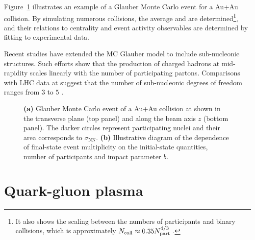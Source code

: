 Figure~\ref{fig:colls:centrality} illustrates an example of a Glauber Monte Carlo event for a Au+Au collision. By simulating numerous collisions, the average \Npart and \Ncoll are determined\footnote{It also shows the scaling between the numbers of participants and binary collisions, which is approximately $N_\mathrm{coll} \approx 0.35 N_\mathrm{part}^{4/3}$ .}, and their relations to centrality and event activity observables are determined by fitting to experimental data.

Recent studies have extended the MC Glauber model to include sub-nucleonic structures. Such efforts show that the production of charged hadrons at mid-rapidity scales linearly with the number of participating partons. Comparisons with LHC data at  suggest that the number of sub-nucleonic degrees of freedom ranges from $3$ to $5$ \cite{loizidesGlauberModelingHighenergy2016}.

\begin{figure}[H]
\hspace{2em}
\caption{\textbf{(a)} Glauber Monte Carlo event of a Au+Au collision at  shown in the transverse plane (top panel) and along the beam axis $z$ (bottom panel). The darker circles represent participating nuclei and their area corresponds to $\sigma_\mathrm{NN}$. \textbf{(b)} Illustrative diagram of the dependence of final-state event multiplicity on the initial-state quantities, number of participants \Npart and impact parameter $b$. \cite{millerGlauberModelingHigh2007}}
\label{fig:colls:centrality}
\end{figure}

\section{Quark-gluon plasma}

